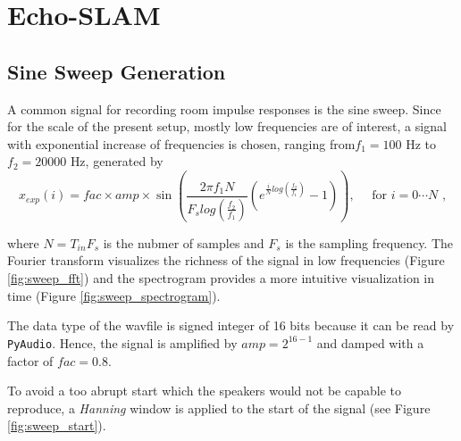 \newpage
\section{Echo-SLAM}

\subsection{Sine Sweep Generation}

A common signal for recording room impulse responses is the sine sweep. 
Since for the scale of the present setup, mostly low frequencies are of interest, a signal with exponential increase of frequencies is chosen, ranging from$f_1=100 \text{ Hz}$ to $f_2=20000 \text{ Hz}$, generated by 
\begin{equation}
    x_{exp}(i) = fac \times amp \times \sin(\frac{2 \pi f_1 N}{F_s log(\frac{f_2}{f_1})}  (e^{\frac{i}{N}log(\frac{f_2}{f_1})} - 1)), \quad \text{ for $i = 0 \cdots N$ ,}
    \label{}
\end{equation}

where $N=T_{in} F_s$ is the nubmer of samples and $F_s$ is the sampling frequency. The Fourier transform visualizes the richness of the signal in low frequencies (Figure \ref{fig:sweep_fft}) and the spectrogram provides a more intuitive visualization in time (Figure \ref{fig:sweep_spectrogram}).

The data type of the wavfile is signed integer of 16 bits because it can be read by \texttt{PyAudio}. Hence, the signal is amplified by $amp=2^{16-1}$ and damped with a factor of $fac=0.8$. 

To avoid a too abrupt start which the speakers would not be capable to reproduce, a \textit{Hanning} window is applied to the start of the signal (see Figure \ref{fig:sweep_start}).

